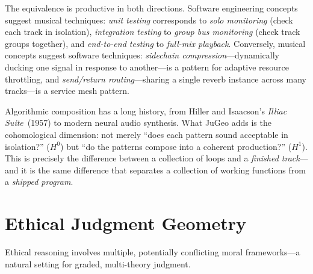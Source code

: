 \begin{remark}
The equivalence is productive in both directions.  Software
engineering concepts suggest musical techniques: \emph{unit
testing} corresponds to \emph{solo monitoring} (check each track
in isolation), \emph{integration testing} to \emph{group bus
monitoring} (check track groups together), and \emph{end-to-end
testing} to \emph{full-mix playback}.  Conversely, musical
concepts suggest software techniques: \emph{sidechain
compression}---dynamically ducking one signal in response to
another---is a pattern for adaptive resource throttling, and
\emph{send/return routing}---sharing a single reverb instance
across many tracks---is a service mesh pattern.
\end{remark}

\begin{remark}
Algorithmic composition has a long history, from Hiller and
Isaacson's \emph{Illiac Suite}~(1957) to modern neural audio
synthesis.  What JuGeo adds is the cohomological dimension: not
merely ``does each pattern sound acceptable in isolation?''
($H^0$) but ``do the patterns compose into a coherent
production?'' ($H^1$).  This is precisely the difference between
a collection of loops and a \emph{finished track}---and it is the
same difference that separates a collection of working functions
from a \emph{shipped program}.
\end{remark}

\section{Ethical Judgment Geometry}
\label{sec:ethical}

Ethical reasoning involves multiple, potentially conflicting moral
frameworks---a natural setting for graded, multi-theory judgment.


